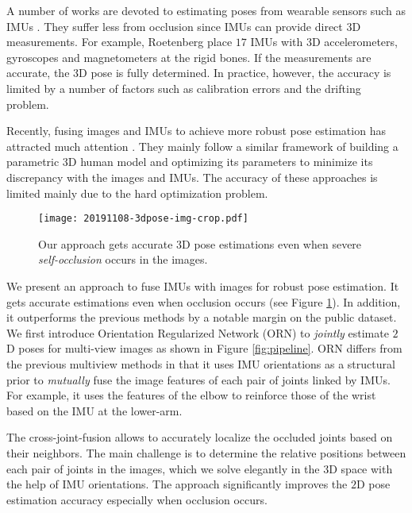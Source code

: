 \documentclass[10pt,twocolumn,letterpaper]{article}
\begin{document}
A number of works are devoted to estimating poses from wearable sensors such as IMUs \cite{trumble2017total,roetenberg2009xsens,von2016human,von2017sparse}. They suffer less from occlusion since IMUs can provide direct $3$D measurements. For example, Roetenberg \etal \cite{roetenberg2009xsens} place $17$ IMUs with $3$D accelerometers, gyroscopes and magnetometers at the rigid bones. If the measurements are accurate, the $3$D pose is fully determined. In practice, however, the accuracy is limited by a number of factors such as calibration errors and the drifting problem.

Recently, fusing images and IMUs to achieve more robust pose estimation has attracted much attention \cite{trumble2017total,von2018recovering,gilbert2019fusing,malleson2017real}. They mainly follow a similar framework of building a parametric $3$D human model and optimizing its parameters to minimize its discrepancy with the images and IMUs. The accuracy of these approaches is limited mainly due to the hard optimization problem. 

\begin{figure}
	\centering
	\texttt{[image: 20191108-3dpose-img-crop.pdf]}
	\caption{Our approach gets accurate $3$D pose estimations even when severe \emph{self-occlusion} occurs in the images.}
	\label{fig:sample}
\end{figure}

We present an approach to fuse IMUs with images for robust pose estimation. It gets accurate estimations even when occlusion occurs (see Figure \ref{fig:sample}). In addition, it outperforms the previous methods \cite{malleson2017real, von2018recovering} by a notable margin on the public dataset. 
We first introduce Orientation Regularized Network (ORN) to \emph{jointly} estimate $2$D poses for multi-view images as shown in Figure \ref{fig:pipeline}. ORN differs from the previous multiview methods \cite{qiu2019cross} in that it uses IMU orientations as a structural prior to \emph{mutually} fuse the image features of each pair of joints linked by IMUs. For example, it uses the features of the elbow to reinforce those of the wrist based on the IMU at the lower-arm. 

The cross-joint-fusion allows to accurately localize the occluded joints based on their neighbors. The main challenge is to determine the relative positions between each pair of joints in the images, which we solve elegantly in the $3$D space with the help of IMU orientations. The approach significantly improves the $2$D pose estimation accuracy especially when occlusion occurs. 
\end{document}
